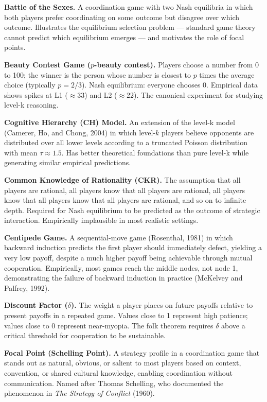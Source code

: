 \documentclass[12pt, letterpaper]{article}
\begin{document}
\textbf{Battle of the Sexes.} A coordination game with two Nash equilibria in which both players prefer coordinating on some outcome but disagree over which outcome. Illustrates the equilibrium selection problem --- standard game theory cannot predict which equilibrium emerges --- and motivates the role of focal points.

\textbf{Beauty Contest Game ($p$-beauty contest).} Players choose a number from 0 to 100; the winner is the person whose number is closest to $p$ times the average choice (typically $p = 2/3$). Nash equilibrium: everyone chooses 0. Empirical data shows spikes at L1 ($\approx$33) and L2 ($\approx$22). The canonical experiment for studying level-k reasoning.

\textbf{Cognitive Hierarchy (CH) Model.} An extension of the level-k model (Camerer, Ho, and Chong, 2004) in which level-$k$ players believe opponents are distributed over all lower levels according to a truncated Poisson distribution with mean $\tau \approx 1.5$. Has better theoretical foundations than pure level-k while generating similar empirical predictions.

\textbf{Common Knowledge of Rationality (CKR).} The assumption that all players are rational, all players know that all players are rational, all players know that all players know that all players are rational, and so on to infinite depth. Required for Nash equilibrium to be predicted as the outcome of strategic interaction. Empirically implausible in most realistic settings.

\textbf{Centipede Game.} A sequential-move game (Rosenthal, 1981) in which backward induction predicts the first player should immediately defect, yielding a very low payoff, despite a much higher payoff being achievable through mutual cooperation. Empirically, most games reach the middle nodes, not node 1, demonstrating the failure of backward induction in practice (McKelvey and Palfrey, 1992).

\textbf{Discount Factor ($\delta$).} The weight a player places on future payoffs relative to present payoffs in a repeated game. Values close to 1 represent high patience; values close to 0 represent near-myopia. The folk theorem requires $\delta$ above a critical threshold for cooperation to be sustainable.

\textbf{Focal Point (Schelling Point).} A strategy profile in a coordination game that stands out as natural, obvious, or salient to most players based on context, convention, or shared cultural knowledge, enabling coordination without communication. Named after Thomas Schelling, who documented the phenomenon in \textit{The Strategy of Conflict} (1960).
\end{document}
